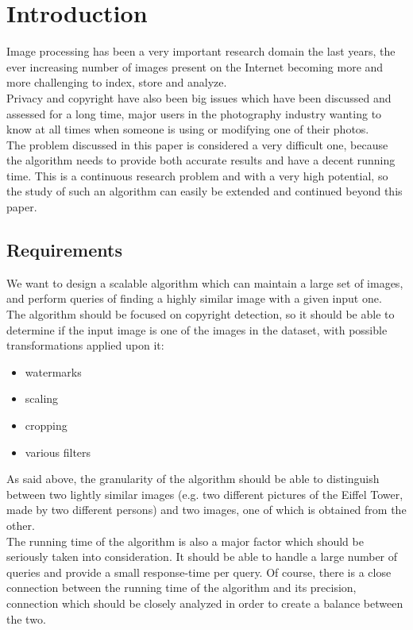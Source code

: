 \chapter{Introduction}

Image processing has been a very important research domain the last years, the ever increasing number of images present on the Internet becoming more and more challenging to index, store and analyze.\\
Privacy and copyright have also been big issues which have been discussed and assessed for a long time, major users in the photography industry wanting to know at all times when someone is using or modifying one of their photos.\\
The problem discussed in this paper is considered a very difficult one, because the algorithm needs to provide both accurate results and have a decent running time. This is a continuous research problem and with a very high potential, so the study of such an algorithm can easily be extended and continued beyond this paper.

\section{Requirements}

We want to design a scalable algorithm which can maintain a large set of images, and perform queries of finding a highly similar image with a given input one. \\
The algorithm should be focused on copyright detection, so it should be able to determine if the input image is one of the images in the dataset, with possible transformations applied upon it:
\begin{itemize}
	\item watermarks
	\item scaling
	\item cropping
	\item various filters
\end{itemize}

As said above, the granularity of the algorithm should be able to distinguish between two lightly similar images (e.g. two different pictures of the Eiffel Tower, made by two different persons) and two images, one of which is obtained from the other.\\

The running time of the algorithm is also a major factor which should be seriously taken into consideration. It should be able to handle a large number of queries and provide a small response-time per query. Of course, there is a close connection between the running time of the algorithm and its precision, connection which should be closely analyzed in order to create a balance between the two.

